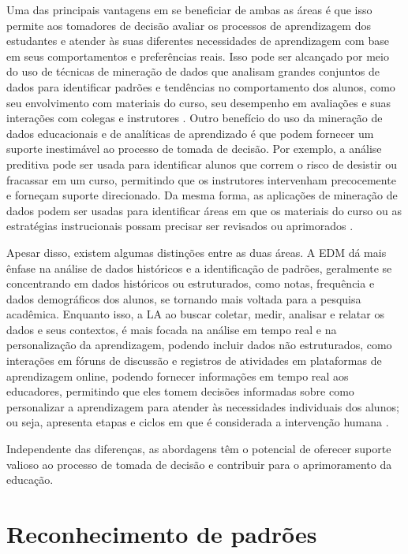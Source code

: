 Uma das principais vantagens em se beneficiar de ambas as áreas é que isso permite aos tomadores de decisão avaliar os processos de aprendizagem dos estudantes e atender às suas diferentes necessidades de aprendizagem com base em seus comportamentos e preferências reais. Isso pode ser alcançado por meio do uso de técnicas de mineração de dados que analisam grandes conjuntos de dados para identificar padrões e tendências no comportamento dos alunos, como seu envolvimento com materiais do curso, seu desempenho em avaliações e suas interações com colegas e instrutores \cite{Cerezo2016}. Outro benefício do uso da mineração de dados educacionais e de analíticas de aprendizado é que podem fornecer um suporte inestimável ao processo de tomada de decisão. Por exemplo, a análise preditiva pode ser usada para identificar alunos que correm o risco de desistir ou fracassar em um curso, permitindo que os instrutores intervenham precocemente e forneçam suporte direcionado. Da mesma forma, as aplicações de mineração de dados podem ser usadas para identificar áreas em que os materiais do curso ou as estratégias instrucionais possam precisar ser revisados ou aprimorados \cite{Aldowah2019}.

{Apesar disso, existem algumas distinções entre as duas áreas. A EDM dá mais ênfase na análise de dados históricos e a identificação de padrões, geralmente se concentrando em dados históricos ou estruturados, como notas, frequência e dados demográficos dos alunos, se tornando mais voltada para a pesquisa acadêmica. Enquanto isso, a LA ao buscar coletar, medir, analisar e relatar os dados e seus contextos, é mais focada na análise em tempo real e na personalização da aprendizagem, podendo incluir dados não estruturados, como interações em fóruns de discussão e registros de atividades em plataformas de aprendizagem online, podendo fornecer informações em tempo real aos educadores, permitindo que eles tomem decisões informadas sobre como personalizar a aprendizagem para atender às necessidades individuais dos alunos; ou seja, apresenta etapas e ciclos em que é considerada a intervenção humana \cite{Campos2021}.}

{Independente das diferenças, as abordagens têm o potencial de oferecer suporte valioso ao processo de tomada de decisão e contribuir para o aprimoramento da educação.}


\section{Reconhecimento de padrões}

